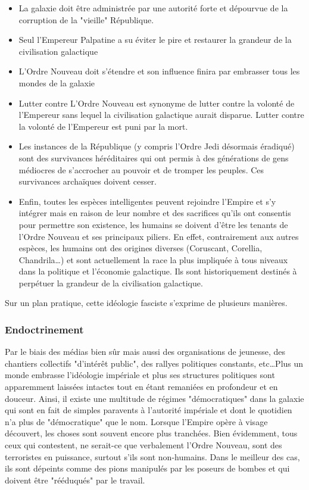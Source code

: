 \documentclass[twoside]{article}
\begin{document}
\begin{itemize}
	\item La galaxie doit être administrée par une autorité forte et dépourvue de la corruption de la "vieille" République.
	\item Seul l'Empereur Palpatine a su éviter le pire et restaurer la grandeur de la civilisation galactique
	\item L'Ordre Nouveau doit s'étendre et son influence finira par embrasser tous les mondes de la galaxie
	\item Lutter contre L'Ordre Nouveau est synonyme de lutter contre la volonté de l'Empereur sans lequel la civilisation galactique aurait disparue. Lutter contre la volonté de l'Empereur est puni par la mort.
	\item Les instances de la République (y compris l'Ordre Jedi désormais éradiqué) sont des survivances héréditaires qui ont permis à des générations de gens médiocres de s'accrocher au pouvoir et de tromper les peuples. Ces survivances archaïques doivent cesser.
	\item Enfin, toutes les espèces intelligentes peuvent rejoindre l'Empire et s'y intégrer mais en raison de leur nombre et des sacrifices qu'ils ont consentis pour permettre son existence, les humains se doivent d'être les tenants de l'Ordre Nouveau et ses principaux piliers.  En effet, contrairement aux autres espèces, les humains ont des origines diverses (Coruscant, Corellia, Chandrila\ldots) et sont actuellement la race la plus impliquée à tous niveaux dans la politique et l'économie galactique. Ils sont historiquement destinés à perpétuer la grandeur de la civilisation galactique. 
\end{itemize}

Sur un plan pratique, cette idéologie fasciste s'exprime de plusieurs manières.

\subsubsection{Endoctrinement}
Par le biais des médias bien sûr mais aussi des organisations de jeunesse, des chantiers collectifs "d'intérêt public", des rallyes politiques constants, etc\ldots Plus un monde embrasse l'idéologie impériale et plus ses structures politiques sont apparemment laissées intactes tout en étant remaniées en profondeur et en douceur. Ainsi, il existe une multitude de régimes "démocratiques" dans la galaxie qui sont en fait de simples paravents à l'autorité impériale et dont le quotidien n'a plus de "démocratique" que le nom. Lorsque l'Empire opère à visage découvert, les choses sont souvent encore plus tranchées. Bien évidemment, tous ceux qui contestent, ne serait-ce que verbalement l'Ordre Nouveau, sont des terroristes en puissance, surtout s'ils sont non-humains. Dans le meilleur des cas, ils sont dépeints comme des pions manipulés par les poseurs de bombes et qui doivent être "rééduqués" par le travail.
\end{document}

